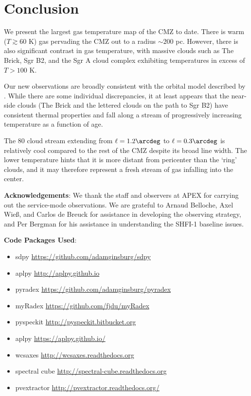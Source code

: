 \section{Conclusion}
We present the largest gas temperature map of the CMZ to date.  There is warm
($T\gtrsim60$ K) gas pervading the CMZ out to a radius $\sim200$ pc.  However,
there is also significant contrast in gas temperature, with massive clouds such
as The Brick, Sgr B2, and the Sgr A cloud complex exhibiting temperatures in
excess of $T>100$ K.

Our new observations are broadly consistent with the orbital model described by
\citet{Kruijssen2014d}.  While there are some individual discrepancies, it at
least appears that the near-side clouds (The Brick and the lettered clouds on
the path to Sgr B2) have consistent thermal properties and fall along a stream
of progressively increasing temperature as a function of age.  

The 80 \kms cloud stream extending from $\ell=1.2\arcdeg$ to $\ell=0.3\arcdeg$
is relatively cool compared to the rest of the CMZ despite its broad line
width.  The lower temperature hints that it is more distant from pericenter
than the `ring' clouds, and it may therefore represent a fresh stream of gas
infalling into the center.

\textbf{Acknowledgements}:
We thank the staff and observers at APEX for carrying out the service-mode
observations.  We are grateful to Arnaud Belloche, Axel Wieß, and Carlos de
Breuck for assistance in developing the observing strategy, and Per Bergman for
his assistance in understanding the SHFI-1 baseline issues.

\textbf{Code Packages Used}:

\begin{itemize}
    \item sdpy \url{https://github.com/adamginsburg/sdpy}
    \item aplpy \url{http://aplpy.github.io}
    \item pyradex \url{https://github.com/adamginsburg/pyradex}
    \item myRadex \url{https://github.com/fjdu/myRadex}
    \item pyspeckit \url{http://pyspeckit.bitbucket.org}
    \item aplpy \url{https://aplpy.github.io/}
    \item wcsaxes \url{http://wcsaxes.readthedocs.org}
    \item spectral cube \url{http://spectral-cube.readthedocs.org}
    \item pvextractor \url{http://pvextractor.readthedocs.org/}
\end{itemize}

